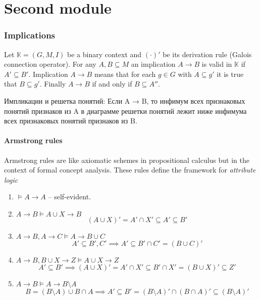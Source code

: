 \documentclass[a4paper]{article}
\newcommand{\brac}[1]{{\left ( #1 \right )}}
\newcommand{\Ctx}{\mathbb{K}}
\begin{document}
\part{Second module} %
\label{prt:second_module}

\section{Implications} %
\label{sec:implications}

Let $\Ctx = \brac{G,M,I}$ be a binary context and ${(\cdot)}'$ be its derivation rule (Galois connection operator). For any $A,B\subseteq M$ an implication $A\to B$ is valid in $\Ctx$ if $A'\subseteq B'$. Implication $A\to B$ means that for each $g\in G$ with $A\subseteq g'$ it is true that $B\subseteq g'$. Finally $A\to B$ if and only if $B\subseteq A''$.

Импликации и решетка понятий: Если A → B, то инфимум всех признаковых понятий признаков из A в диаграмме решетки понятий лежит ниже инфимума всех признаковых понятий признаков из B.


\subsection{Armstrong rules} %
\label{sub:armstrong_rules}
Armstrong rules are like axiomatic schemes in propositional calculus but in the context of formal concept analysis. These rules define the framework for \emph{attribute logic}
\begin{enumerate}
	\item $\models A\to A$ -- self-evident.
	\item $A\to B\models A\cup X\to B$\hfill\[\brac{A\cup X}' = A'\cap X'\subseteq A'\subseteq B'\]
	\item $A\to B, A\to C\models A\to B\cup C$\hfill\[A'\subseteq B', C' \implies A'\subseteq B'\cap C' = \brac{B\cup C}'\]
	\item $A\to B, B\cup X\to Z\models A\cup X\to Z$\hfill
	\[ A'\subseteq B'\implies \brac{A\cup X}' = A'\cap X'  \subseteq B'\cap X' = \brac{B\cup X}' \subseteq Z'\]
	\item $A\to B\models A\to B\setminus A$\hfill \[B = (B\setminus A) \cup B\cap A \implies A'\subseteq B' = \brac{B\setminus A}' \cap \brac{B\cap A}'\subseteq \brac{B\setminus A}'\]
\end{enumerate}
\end{document}
